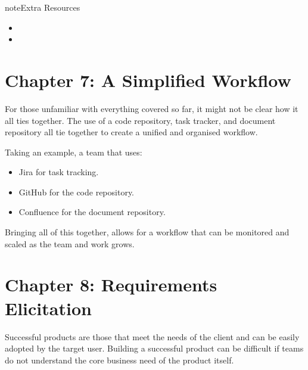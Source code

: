 \documentclass[letterpaper,10pt,english]{jupyterBook}
\begin{document}
\begin{sphinxadmonition}{note}{Extra Resources}
\begin{itemize}
\item {} 
\sphinxAtStartPar
{}

\item {} 
\sphinxAtStartPar
{}

\end{itemize}
\end{sphinxadmonition}


\chapter{Chapter 7: A Simplified Workflow}
\label{\detokenize{chapter_7/simplified_workflow:chapter-7-a-simplified-workflow}}\label{\detokenize{chapter_7/simplified_workflow::doc}}
\sphinxAtStartPar
For those unfamiliar with everything covered so far, it might not be
clear how it all ties together. The use of a code repository, task
tracker, and document repository all tie together to create a unified
and organised workflow.

\sphinxAtStartPar
Taking an example, a team that uses:
\begin{itemize}
\item {} 
\sphinxAtStartPar
Jira for task tracking.

\item {} 
\sphinxAtStartPar
GitHub for the code repository.

\item {} 
\sphinxAtStartPar
Confluence for the document repository.

\end{itemize}

\sphinxAtStartPar
Bringing all of this together, allows for a workflow that can be
monitored and scaled as the team and work grows.

\sphinxAtStartPar
{}


\chapter{Chapter 8: Requirements Elicitation}
\label{\detokenize{chapter_8/requirements_elicitation:chapter-8-requirements-elicitation}}\label{\detokenize{chapter_8/requirements_elicitation::doc}}
\sphinxAtStartPar
Successful products are those that meet the needs of the client and can
be easily adopted by the target user. Building a successful product can
be difficult if teams do not understand the core business need of the
product itself.
\end{document}
